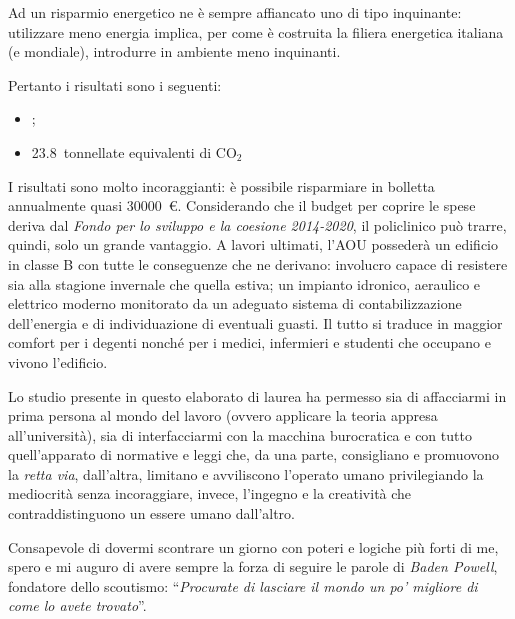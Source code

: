 Ad un risparmio energetico ne è sempre affiancato uno di tipo inquinante: utilizzare meno energia implica, per come è costruita la filiera energetica italiana (e mondiale), introdurre in ambiente meno inquinanti.

Pertanto i risultati sono i seguenti:
\begin{itemize}
	\item {}; %
	\item \num{23.8}\ tonnellate equivalenti di $\mathrm{CO_2}$ %
\end{itemize}

I risultati sono molto incoraggianti: è possibile risparmiare in bolletta annualmente quasi \num{30000}\ \euro. Considerando che il budget per coprire le spese deriva dal \emph{Fondo per lo sviluppo e la coesione 2014-2020}, il policlinico può trarre, quindi, solo un grande vantaggio. A lavori ultimati, l'AOU possederà un edificio in classe B con tutte le conseguenze che ne derivano: involucro capace di resistere sia alla stagione invernale che quella estiva; un impianto idronico, aeraulico e elettrico moderno monitorato da un adeguato sistema di contabilizzazione dell'energia e di individuazione di eventuali guasti. Il tutto si traduce in maggior comfort per i degenti nonché per i medici, infermieri e studenti che occupano e vivono l'edificio.

\vspace{2em}
Lo studio presente in questo elaborato di laurea ha permesso sia di affacciarmi in prima persona al mondo del lavoro (ovvero applicare la teoria appresa all'università), sia di interfacciarmi con la macchina burocratica e con tutto quell'apparato di normative e leggi che, da una parte, consigliano e promuovono la \emph{retta via}, dall'altra, limitano e avviliscono l'operato umano privilegiando la mediocrità senza incoraggiare, invece, l'ingegno e la creatività che contraddistinguono un essere umano dall'altro.

Consapevole di dovermi scontrare un giorno con poteri e logiche più forti di me, spero e mi
 auguro di avere sempre la forza di seguire le parole di \emph{Baden Powell}, fondatore dello scoutismo: ``\emph{Procurate di lasciare il mondo un po' migliore di come lo avete trovato}''.